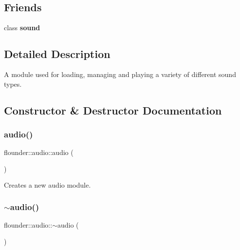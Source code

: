 \subsection*{Friends}
\begin{DoxyCompactItemize}
\item 
\mbox{\label{classflounder_1_1audio_a6508242aa0a45174f94d245f432cecbc}} 
class {\bfseries sound}
\end{DoxyCompactItemize}


\subsection{Detailed Description}
A module used for loading, managing and playing a variety of different sound types. 



\subsection{Constructor \& Destructor Documentation}
\mbox{\label{classflounder_1_1audio_a0aabbb226f542847145d89adb1144c16}} 
\subsubsection{\texorpdfstring{audio()}{audio()}}
{\footnotesize\ttfamily flounder\+::audio\+::audio (\begin{DoxyParamCaption}{ }\end{DoxyParamCaption})}



Creates a new audio module. 

\mbox{\label{classflounder_1_1audio_afb4d3bbb9ae399385a3abfe6e4e6d7ee}} 
\subsubsection{\texorpdfstring{$\sim$audio()}{~audio()}}
{\footnotesize\ttfamily flounder\+::audio\+::$\sim$audio (\begin{DoxyParamCaption}{ }\end{DoxyParamCaption})}



